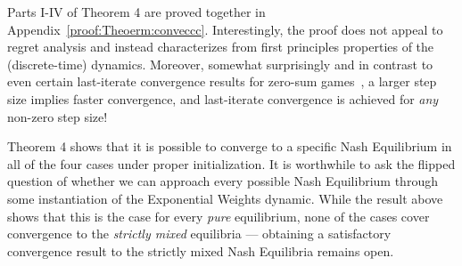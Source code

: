 
Parts I-IV of Theorem 4 are proved together in Appendix~\ref{proof:Theoerm:conveccc}.
Interestingly, the proof does not appeal to regret analysis and instead characterizes from first principles properties of the (discrete-time) dynamics. 
Moreover, somewhat surprisingly and in contrast to even certain last-iterate convergence results for zero-sum games~\cite{daskalakis2019last}, a larger step size implies faster convergence, and last-iterate convergence is achieved for \emph{any} non-zero step size!

Theorem 4 shows that it is possible to converge to a specific Nash Equilibrium in all of the four cases under proper initialization. 
It is worthwhile to ask the flipped question of whether we can approach every possible Nash Equilibrium through some instantiation of the Exponential Weights dynamic.
While the result above shows that this is the case for every \emph{pure} equilibrium, none of the cases cover convergence to the \emph{strictly mixed} equilibria --- obtaining a satisfactory convergence result to the strictly mixed Nash Equilibria remains open.


